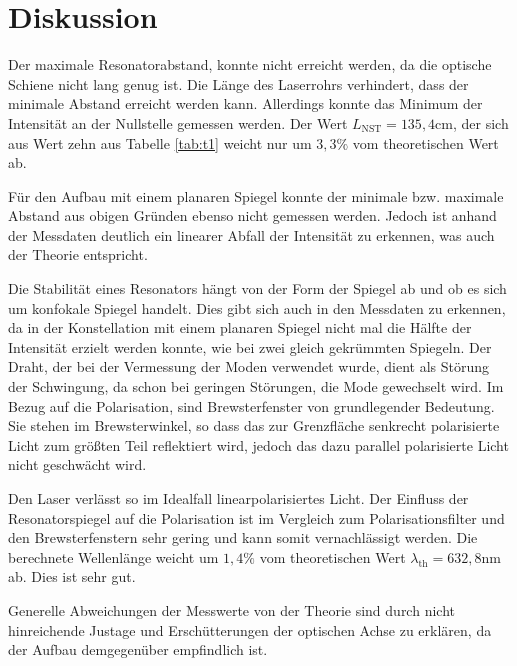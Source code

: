 \section{Diskussion}
Der maximale Resonatorabstand, konnte nicht erreicht werden, da die optische Schiene nicht lang genug ist. Die Länge des Laserrohrs verhindert, dass der minimale Abstand erreicht werden kann. Allerdings konnte das Minimum der Intensität an der Nullstelle gemessen werden. Der Wert \(L_{\text{NST}}=135,4\text{cm}\), der sich aus Wert zehn aus Tabelle \ref{tab:t1} weicht nur um \(3,3\%\) vom theoretischen Wert ab.

\noindent Für den Aufbau mit einem planaren Spiegel konnte der minimale bzw. maximale Abstand aus obigen Gründen ebenso nicht gemessen werden. Jedoch ist anhand der Messdaten deutlich ein linearer Abfall der Intensität zu erkennen, was auch der Theorie entspricht.

\noindent Die Stabilität eines Resonators hängt von der Form der Spiegel ab und ob es sich um konfokale Spiegel handelt. Dies gibt sich auch in den Messdaten zu erkennen, da in der Konstellation mit einem planaren Spiegel nicht mal die Hälfte der Intensität erzielt werden konnte, wie bei zwei gleich gekrümmten Spiegeln.
\noindent Der Draht, der bei der Vermessung der Moden verwendet wurde, dient als Störung der Schwingung, da schon bei geringen Störungen, die Mode gewechselt wird.
\noindent Im Bezug auf die Polarisation, sind Brewsterfenster von grundlegender Bedeutung. Sie stehen im Brewsterwinkel, so dass das zur Grenzfläche senkrecht polarisierte Licht zum größten Teil reflektiert wird, jedoch das dazu parallel polarisierte Licht nicht geschwächt wird.

\noindent Den Laser verlässt so im Idealfall linearpolarisiertes Licht. Der Einfluss der Resonatorspiegel auf die Polarisation ist im Vergleich zum Polarisationsfilter und den Brewsterfenstern sehr gering und kann somit vernachlässigt werden.
Die berechnete Wellenlänge weicht um \(1,4\%\) vom theoretischen Wert \(\lambda_{\text{th}}=632,8\text{nm}\) ab. Dies ist sehr gut.

\noindent Generelle Abweichungen der Messwerte von der Theorie sind durch nicht hinreichende Justage und Erschütterungen der optischen Achse zu erklären, da der Aufbau demgegenüber empfindlich ist.